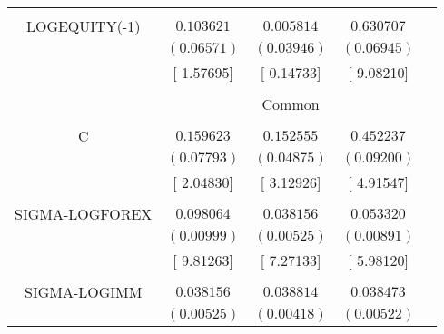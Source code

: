 \begin{tabular}{lrrrr}
\multicolumn{1}{c}{}&\multicolumn{1}{c}{}&\multicolumn{1}{c}{}&\multicolumn{1}{c}{}&\multicolumn{1}{c}{}\\
\multicolumn{1}{c}{LOGEQUITY(-1)}&\multicolumn{1}{c}{$0.103621$}&\multicolumn{1}{c}{$0.005814$}&\multicolumn{1}{c}{$0.630707$}&\multicolumn{1}{c}{}\\
\multicolumn{1}{c}{}&\multicolumn{1}{c}{$(0.06571)$}&\multicolumn{1}{c}{$(0.03946)$}&\multicolumn{1}{c}{$(0.06945)$}&\multicolumn{1}{c}{}\\
\multicolumn{1}{c}{}&\multicolumn{1}{c}{[ 1.57695]}&\multicolumn{1}{c}{[ 0.14733]}&\multicolumn{1}{c}{[ 9.08210]}&\multicolumn{1}{c}{}\\
[4.5pt] \hline \\ [-4.5pt]
\multicolumn{1}{c}{}&\multicolumn{3}{c}{Common}&\multicolumn{1}{c}{}\\
[4.5pt] \hline \\ [-4.5pt]
\multicolumn{1}{c}{C}&\multicolumn{1}{c}{$0.159623$}&\multicolumn{1}{c}{$0.152555$}&\multicolumn{1}{c}{$0.452237$}&\multicolumn{1}{c}{}\\
\multicolumn{1}{c}{}&\multicolumn{1}{c}{$(0.07793)$}&\multicolumn{1}{c}{$(0.04875)$}&\multicolumn{1}{c}{$(0.09200)$}&\multicolumn{1}{c}{}\\
\multicolumn{1}{c}{}&\multicolumn{1}{c}{[ 2.04830]}&\multicolumn{1}{c}{[ 3.12926]}&\multicolumn{1}{c}{[ 4.91547]}&\multicolumn{1}{c}{}\\
\multicolumn{1}{c}{}&\multicolumn{1}{c}{}&\multicolumn{1}{c}{}&\multicolumn{1}{c}{}&\multicolumn{1}{c}{}\\
\multicolumn{1}{c}{SIGMA-LOGFOREX}&\multicolumn{1}{c}{$0.098064$}&\multicolumn{1}{c}{$0.038156$}&\multicolumn{1}{c}{$0.053320$}&\multicolumn{1}{c}{}\\
\multicolumn{1}{c}{}&\multicolumn{1}{c}{$(0.00999)$}&\multicolumn{1}{c}{$(0.00525)$}&\multicolumn{1}{c}{$(0.00891)$}&\multicolumn{1}{c}{}\\
\multicolumn{1}{c}{}&\multicolumn{1}{c}{[ 9.81263]}&\multicolumn{1}{c}{[ 7.27133]}&\multicolumn{1}{c}{[ 5.98120]}&\multicolumn{1}{c}{}\\
\multicolumn{1}{c}{}&\multicolumn{1}{c}{}&\multicolumn{1}{c}{}&\multicolumn{1}{c}{}&\multicolumn{1}{c}{}\\
\multicolumn{1}{c}{SIGMA-LOGIMM}&\multicolumn{1}{c}{$0.038156$}&\multicolumn{1}{c}{$0.038814$}&\multicolumn{1}{c}{$0.038473$}&\multicolumn{1}{c}{}\\
\multicolumn{1}{c}{}&\multicolumn{1}{c}{$(0.00525)$}&\multicolumn{1}{c}{$(0.00418)$}&\multicolumn{1}{c}{$(0.00522)$}&\multicolumn{1}{c}{}\\

\end{tabular}
